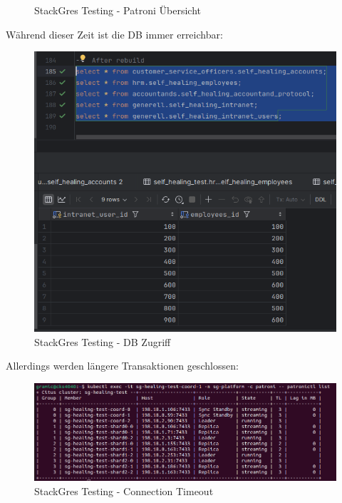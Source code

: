\begin{flushleft}
\begin{figure}[H]
        \caption{StackGres Testing - Patroni Übersicht}
        \label{fig:stackgres_patroni_failover_overview}
    \end{figure}
    Während dieser Zeit ist die DB immer erreichbar:
    \begin{figure}[H]
        \centering
        \includegraphics[width=0.5\linewidth]{source/appendix/evaluation_testing/stackgres_node_down_access_possible}
        \caption{StackGres Testing - DB Zugriff}
        \label{fig:stackgres_node_down_access_possible}
    \end{figure}
    Allerdings werden längere Transaktionen geschlossen:
    \begin{figure}[H]
        \centering
        \includegraphics[width=1\linewidth]{source/appendix/evaluation_testing/stackgres_citus_connection_timeout}
        \caption{StackGres Testing - Connection Timeout}
        \label{fig:stackgres_citus_connection_timeout}
    \end{figure}
\end{flushleft}